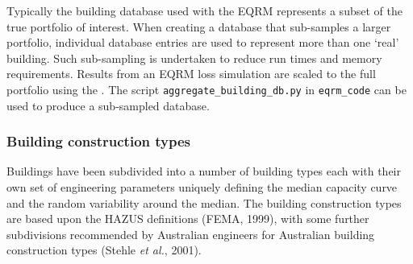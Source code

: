 Typically the building database used with
the EQRM represents a subset of the true portfolio of interest.
When creating a database that sub-samples a larger portfolio,
individual database entries are used to represent more than one
`real' building. Such sub-sampling is undertaken to reduce run
times and memory requirements. Results from an EQRM  loss
simulation are scaled to the full portfolio using the \typesf.  The
script \texttt{aggregate\_building\_db.py} in \texttt{eqrm\_code} can
be used to produce a sub-sampled database.


\subsubsection{Building construction types}
\label{sec:grids-constructionclass}

Buildings have been subdivided into a number of building
types each with their own set of engineering
parameters uniquely defining the median capacity
curve and the random variability around the
median. The building construction types are
based upon the HAZUS definitions (FEMA, 1999),%
with some further subdivisions recommended by Australian engineers for
Australian building construction types (Stehle \textit{et al.}, 2001).%

